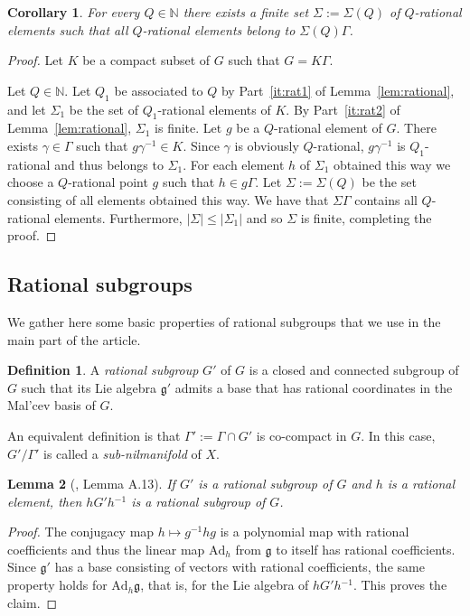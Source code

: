 \documentclass[11pt]{amsart}
\newtheorem{lemma}{Lemma}[section]
\newtheorem{corollary}[lemma]{Corollary}
\theoremstyle{definition}
\newtheorem*{definition}{Definition}
\begin{document}
\begin{corollary}
\label{cor:M-rat}
For every $Q\in{{\mathbb N}}$  there exists a finite set $\Sigma:=\Sigma(Q)$ of $Q$-rational
 elements such that  all $Q$-rational elements belong to $\Sigma(Q)\Gamma$.
\end{corollary}

\begin{proof}
Let $K$ be a compact subset of $G$ such that $G=K\Gamma$.

Let $Q\in{{\mathbb N}}$. Let $Q_1$ be associated to $Q$ by Part~\eqref{it:rat1}
of Lemma~\ref{lem:rational}, and let $\Sigma_1$ be the set of
$Q_1$-rational elements of $K$.  By Part~\eqref{it:rat2} of
Lemma~\ref{lem:rational}, $\Sigma_1$ is finite. Let $g$ be a
$Q$-rational element of $G$. There exists $\gamma\in\Gamma$ such
that $g\gamma{^{-1}}\in K$.  Since $\gamma$ is obviously $Q$-rational,
$g\gamma{^{-1}}$ is $Q_1$-rational and thus belongs to $\Sigma_1$. For
each element $h$ of $\Sigma_1$ obtained this way we choose a
$Q$-rational point $g$ such that $h\in g\Gamma$. Let
$\Sigma:=\Sigma(Q)$ be the set consisting of all elements obtained
this way. We have that $\Sigma\Gamma$ contains all $Q$-rational
elements.  Furthermore,  $|\Sigma|\leq|\Sigma_1|$ and so $\Sigma$ is
finite, completing the proof.
 \end{proof}

\subsection{Rational subgroups} We gather here some basic properties of rational
subgroups that we use in the main part of the article.
\begin{definition}
A \emph{rational subgroup} $G'$ of $G$ is a closed and  connected subgroup
of $G$ such that its Lie algebra $\mathfrak g'$ admits a base
that has  rational coordinates in the Mal'cev basis of $G$.
\end{definition}
An equivalent definition is that $\Gamma':=\Gamma\cap G'$ is
co-compact in $G$. In this case, $G'/\Gamma'$ is  called a
\emph{sub-nilmanifold} of $X$.
\begin{lemma}[\cite{GT12a}, Lemma A.13]
\label{lem:Ap0} If $G'$ is a rational subgroup of $G$ and $h$ is a
rational element, then $hG'h{^{-1}}$ is a rational subgroup of $G$.
\end{lemma}
\begin{proof}
The conjugacy map $h\mapsto g{^{-1}} hg$ is a polynomial map with
rational coefficients and thus the linear map $\mathrm{Ad}_h$ from
$\mathfrak g$ to itself has rational coefficients. Since $\mathfrak
g'$ has a base consisting of vectors with rational coefficients, the
same property holds for $\mathrm{Ad}_h\mathfrak g$, that is, for the
Lie algebra of $hG'h{^{-1}}$. This proves the claim.
\end{proof}
\end{document}
